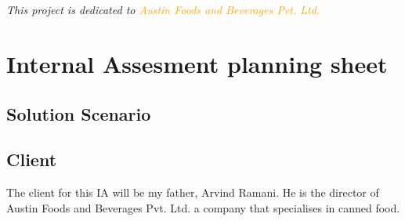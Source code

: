 \documentclass{tufte-book}
\newcommand{\monthyear}{%
  \ifcase\month\or January\or February\or March\or April\or May\or June\or
  July\or August\or September\or October\or November\or
  December\fi\space\number\year
}
\begin{document}
\newpage
\begin{fullwidth}
~\vfill
\thispagestyle{empty}
\setlength{\parindent}{0pt}
\setlength{\parskip}{\baselineskip}
 
 
 
 
 
\tableofcontents
 
\listoffigures
 
\listoftables
 
\cleardoublepage
~\vfill
\begin{doublespace}
\noindent\fontsize{18}{22}\selectfont\itshape
\nohyphenation
This project is dedicated to \textcolor{orange}{Austin Foods and Beverages Pvt. Ltd.}
\end{doublespace}
\vfill
\vfill
 
 
\cleardoublepage
\chapter*{Internal Assesment planning sheet}
\section*{Solution Scenario}

\section*{Client}
The client for this IA will be my father, Arvind Ramani. He is the director of Austin Foods and Beverages Pvt. Ltd. a company that specialises in canned food. 

\end{fullwidth}
\end{document}
